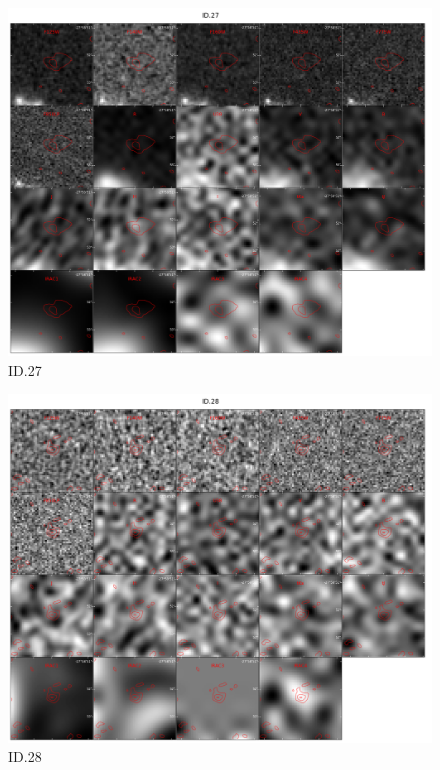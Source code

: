 \begin{figure}[tbp]
\centering \includegraphics[width=160mm]{Matched/ASPECS_Cutout_26.jpg}
\caption{ID.27}
\label{fig:Match_Three}
\end{figure}

\begin{figure}[tbp]
\centering \includegraphics[width=160mm]{Matched/ASPECS_Cutout_27.jpg}
\caption{ID.28}
\label{fig:Match_Three}
\end{figure}

